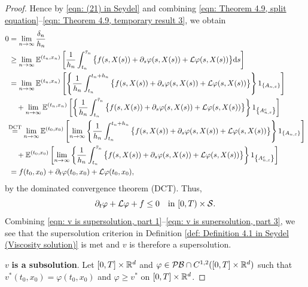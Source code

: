 \begin{proof}
    Hence by \eqref{eqn: (21) in Seydel} and combining \eqref{eqn: Theorem 4.9, split equation}--\eqref{eqn: Theorem 4.9, temporary result 3}, we obtain
    \begin{align*}
        0 &= \lim_{n \rightarrow \infty} \frac{\delta_n}{h_n} \\
        & \geq \lim_{n \rightarrow \infty} \mathbb{E}^{(t_n,x_n)} \left[ \frac{1}{h_n} \int_{t_n}^{\bar \tau_n} \big\{f(s,X(s)) + \partial_s \varphi(s,X(s)) + \mathcal L \varphi(s,X(s))\big\} \mathrm{d} s \right] \\
        & = \lim_{n \rightarrow \infty} \mathbb{E}^{(t_n,x_n)} \left[ \left\{ \frac{1}{h_n} \int_{t_n}^{t_n+h_n} \big\{ f(s,X(s)) + \partial_s \varphi(s,X(s)) + \mathcal L \varphi (s,X(s)) \big\} \right\} 1_{\left\{A_{n,\varepsilon}\right\}}\right] \\
        & \quad + \lim_{n \rightarrow \infty} \mathbb{E}^{(t_n,x_n)} \left[ \left\{ \frac{1}{h_n} \int_{t_n}^{\bar \tau_n} \big\{ f(s,X(s)) + \partial_s \varphi(s,X(s)) + \mathcal L \varphi (s,X(s)) \big\} \right\} 1_{\left\{A_{n,\varepsilon}^c\right\}}\right] \\
        &\! \! \overset{\text{DCT}}{=} \lim_{n \rightarrow \infty} \mathbb{E}^{(t_0,x_0)} \left[ \lim_{n \rightarrow \infty} \left\{ \frac{1}{h_n} \int_{t_n}^{t_n+h_n} \big\{ f(s,X(s)) + \partial_s \varphi(s,X(s)) + \mathcal L \varphi (s,X(s)) \big\} \right\} 1_{\left\{A_{n,\varepsilon}\right\}}\right] \\
        & \quad +\mathbb{E}^{(t_0,x_0)} \left[ \lim_{n \rightarrow \infty} \left\{ \frac{1}{h_n} \int_{t_n}^{\bar \tau_n} \big\{ f(s,X(s)) + \partial_s \varphi(s,X(s)) + \mathcal L \varphi (s,X(s)) \big\} \right\} 1_{\left\{A_{n,\varepsilon}^c\right\}}\right] \\
        & = f(t_0,x_0) + \partial_t \varphi(t_0,x_0) + \mathcal L \varphi (t_0,x_0),
    \end{align*}
    by the dominated convergence theorem (DCT). Thus,
    \begin{equation}
        \partial_t \varphi + \mathcal L \varphi + f \leq 0 \quad \text{in } [0,T) \times \mathcal{S}.
        \label{eqn: v is supersolution, part 3}
    \end{equation}
    Combining \eqref{eqn: v is supersolution, part 1}--\eqref{eqn: v is supersolution, part 3}, we see that the supersolution criterion in Definition \ref{def: Definition 4.1 in Seydel (Viscosity solution)} is met and $v$ is therefore a supersolution. 

    $v$ \textbf{is a subsolution}. Let $[0,T] \times \mathbb{R}^d$ and $\varphi \in \mathcal{PB} \cap C^{1,2}([0,T] \times \mathbb{R}^d)$ such that $v^*(t_0,x_0) = \varphi (t_0,x_0)$ and $\varphi \geq v^*$ on $[0,T] \times \mathbb{R}^d$. 


\end{proof}
